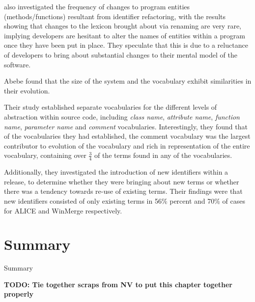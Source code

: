 \cite{Antoniol07a} also investigated the frequency of changes to program entities (methods/functions) resultant from identifier refactoring, with the results showing that changes to the lexicon brought about via renaming are very rare, implying developers are hesitant to alter the names of entities within a program once they have been put in place. They speculate that this is due to a reluctance of developers to bring about substantial changes to their mental model of the software.

Abebe \etal \cite{Abebe09a} found that the size of the system and the vocabulary exhibit similarities in their evolution.

Their study established separate vocabularies for the different levels of abstraction within source code, including \emph{class name}, \emph{attribute name}, \emph{function name}, \emph{parameter name} and \emph{comment} vocabularies. Interestingly, they found that of the vocabularies they had established, the comment vocabulary was the largest contributor to evolution of the vocabulary and rich in representation of the entire vocabulary, containing over $ \frac{3}{4} $ of the terms found in any of the vocabularies.

Additionally, they investigated the introduction of new identifiers within a release, to determine whether they were bringing about new terms or whether there was a tendency towards re-use of existing terms. Their findings were that new identifiers consisted of only existing terms in 56\% percent and 70\% of cases for ALICE and WinMerge respectively.


\section{Summary} %
\label{sec:summary}

Summary


\textbf{TODO: Tie together scraps from NV to put this chapter together properly}



